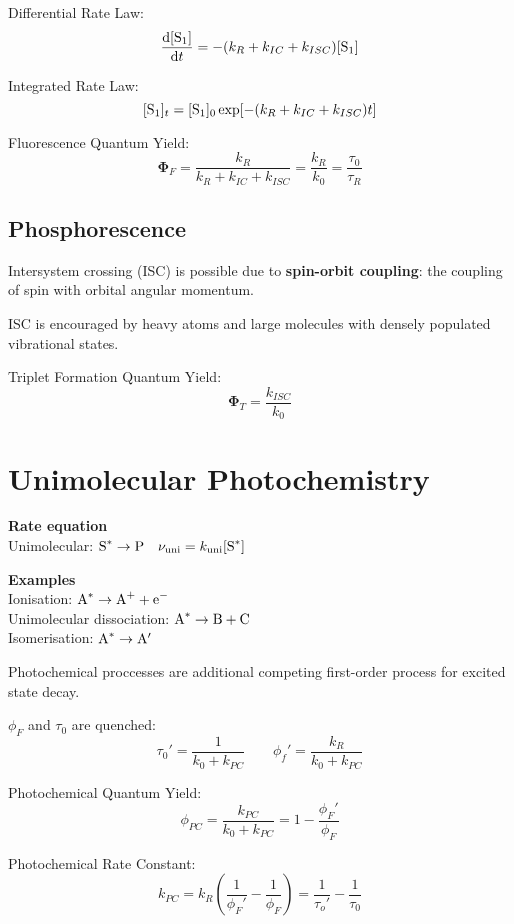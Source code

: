 Differential Rate Law:
$$\frac{\mathrm{d}[\ce{S}_1]}{\mathrm{d}t} = -(k_R +k_{IC} +k_{ISC}) [\ce{S}_1]$$

Integrated Rate Law:
$$[\ce{S}_1]_t = [\ce{S}_1]_0 \exp[-(k_R + k_{IC} + k_{ISC})t]$$

Fluorescence Quantum Yield:
$$\mathbf{\Phi}_F = \frac{k_R}{k_R + k_{IC} + k_{ISC}} = \frac{k_R}{k_0} = \frac{\tau_0}{\tau_R}$$

\subsection*{Phosphorescence}

Intersystem crossing (ISC) is possible due to \textbf{spin-orbit coupling}: the coupling of  spin
with orbital angular momentum.

ISC is encouraged by heavy atoms and large molecules with densely populated vibrational states.
\vspace{\baselineskip}

Triplet Formation Quantum Yield:
$$\mathbf{\Phi}_T = \frac{k_{ISC}}{k_0}$$

\section{Unimolecular Photochemistry}

\textbf{Rate equation} \\
Unimolecular: $\ce{S^*} \rightarrow \ce{P} \quad \nu_{\mathrm{uni}} = k_{\mathrm{uni}}[\ce{S^*}]$
\vspace{\baselineskip}

\textbf{Examples} \\
Ionisation: $\ce{A^*} \rightarrow \ce{A+} + \ce{e-}$ \\
Unimolecular dissociation: $\ce{A^{*}} \rightarrow \ce{B} + \ce{C}$ \\
Isomerisation: $\ce{A^*} \rightarrow \ce{A}'$ \\
\columnbreak

Photochemical proccesses are additional competing first-order process for excited state decay.
\vspace{\baselineskip}

$\phi_F$ and $\tau_0$ are quenched: 
$$\tau_0' = \frac{1}{k_0 + k_{PC}} \qquad \phi_f' = \frac{k_R}{k_0 + k_{PC}}$$

Photochemical Quantum Yield:
$$\phi_{PC} = \frac{k_{PC}}{k_0 + k_{PC}} = 1 - \frac{\phi_F'}{\phi_F}$$

Photochemical Rate Constant:
$$k_{PC} = k_R \left( \frac{1}{\phi_F'} - \frac{1}{\phi_F}\right) = \frac{1}{\tau_o'}- \frac{1}{\tau_0}$$


